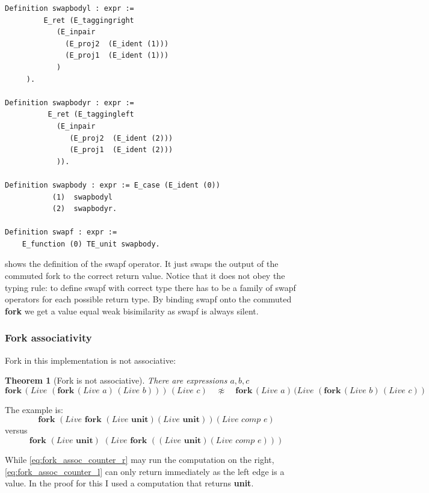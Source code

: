 \documentclass[12pt,twoside,notitlepage]{report}
\theoremstyle{plain}%
\newtheorem{thm}{Theorem}[section]
\theoremstyle{definition}
\theoremstyle{remark}
\begin{document}
\begin{lstlisting}[language={Coq}, caption={Swapf operator}, label={lst:swapf_op}]
Definition swapbodyl : expr :=
         E_ret (E_taggingright
            (E_inpair 
              (E_proj2  (E_ident (1))) 
              (E_proj1  (E_ident (1)))  
            )
     ).

Definition swapbodyr : expr :=
          E_ret (E_taggingleft  
            (E_inpair 
               (E_proj2  (E_ident (2))) 
               (E_proj1  (E_ident (2)))  
            )).

Definition swapbody : expr := E_case (E_ident (0)) 
           (1)  swapbodyl
           (2)  swapbodyr.

Definition swapf : expr :=
    E_function (0) TE_unit swapbody.
\end{lstlisting}
 shows the definition of the swapf operator. It just swaps the output of the commuted fork to the correct return value. Notice that it does not obey the typing rule: to define swapf with correct type there has to be a family of swapf operators for each possible return type. By binding swapf onto the commuted \textbf{fork} we get a value equal weak bisimilarity as swapf is always silent.

\subsubsection{Fork associativity}
Fork in this implementation is not associative:

\begin{thm}[Fork is not associative]
There are expressions $a, b, c$
\[  \textbf{fork}\,(\textit{Live }(\textbf{fork}\,(\textit{Live }a)\,(\textit{Live }b)))\,(\textit{Live }c)\quad \not\approx \quad \textbf{fork}\,(\textit{Live }a)\,(\textit{Live }(\textbf{fork}\,(\textit{Live }b)\,(\textit{Live }c)) \]
\end{thm}

The example is:
\[ \textbf{fork } (\textit{Live }\textbf{fork }(\textit{Live }\textbf{unit})  (\textit{Live }\textbf{unit}))  (\textit{Live }\textit{comp } e) \tag{R-Assoc} \label{eq:fork_assoc_counter_r} \]
versus
\[ \textbf{fork } (\textit{Live }\textbf{unit})\,\,(\textit{Live }  \textbf{fork } ((\textit{Live }\textbf{unit})  (\textit{Live }\textit{comp } e))) \tag{L-Assoc} \label{eq:fork_assoc_counter_l} \]

While \ref{eq:fork_assoc_counter_r} may run the computation on the right, \ref{eq:fork_assoc_counter_l} can only return immediately as the left edge is a value. In the proof for this I used a computation that returns \textbf{unit}.
\end{document}

